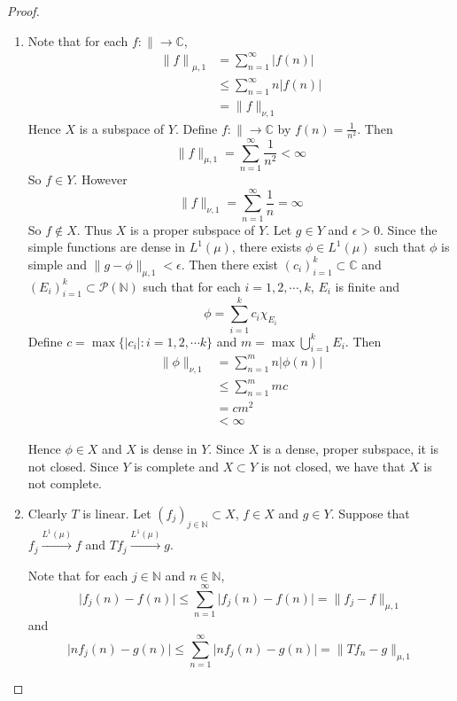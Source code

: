 \documentclass[12pt]{amsart}
\newcommand{\ep}{\epsilon}
\newcommand{\C}{\mathbb{C}}
\newcommand{\N}{\mathbb{N}}
\newcommand{\MP}{\mathcal{P}}
\newcommand{\conv}[1]{\xrightarrow{#1}}
\begin{document}
	\begin{proof}
		\begin{enumerate}
			\item Note that for each $f: \|\rightarrow \C$, 
			\begin{align*}
				{\|f \|}_{\mu, 1}
				&= \sum_{n=1}^{\infty} \vert f(n) \vert  \\
				& \leq \sum_{n=1}^{\infty} n \vert f(n) \vert  \\
				& = \|f \|_{\nu,1} 
			\end{align*} 
			Hence $X$ is a subspace of $Y$. Define $f : \|\rightarrow \C$ by $f(n) = \frac{1}{n^2}$. Then $$\|f \|_{\mu, 1} = \sum_{n=1}^{\infty} \frac{1}{n^2} < \infty$$ So  $f \in Y$. However $$\|f \|_{\nu, 1} = \sum_{n=1}^\infty \frac{1}{n} = \infty$$ So $f \not \in X$. Thus $X$ is a proper subspace of $Y$. Let $g \in Y$ and $\ep >0$. Since the simple functions are dense in $L^1(\mu)$, there exists $\phi \in L^1(\mu)$ such that $\phi$ is simple and $\|g - \phi \|_{\mu ,1} < \ep$. Then there exist $(c_i)_{i=1}^k \subset \C$ and $ (E_i)_{i=1}^k \subset \MP(\N)$ such that for each $i =1,2,\cdots, k$, $E_i$ is finite and  $$\phi = \sum_{i=1}^kc_i \chi_{E_i}$$ Define $c = \max\{\vert c_i \vert: i=1,2,\cdots k\}$ and $m = \max \bigcup_{i=1}^k E_i$. Then 
			\begin{align*}
				\|\phi \|_{\nu,1} 
				&=  \sum_{n=1}^m n \vert \phi(n) \vert \\
				& \leq \sum_{n=1}^m  mc \\
				& = c m^2 \\
				& < \infty
			\end{align*}
			
			Hence $\phi \in X$ and $X$ is dense in $Y$. Since $X$ is a dense, proper subspace, it is not closed. Since $Y$ is complete and $X \subset Y$ is not closed, we have that $X$ is not complete.
			\item Clearly $T$ is linear. Let $(f_j)_{j \in \N} \subset X$, $f \in X$ and $g \in Y$. Suppose that $f_j \conv{L^1(\mu)} f$ and $Tf_j \conv{L^1(\mu)} g$. 
			
			Note that for each $j \in \N$ and $n \in \N$, $$\vert f_j(n) - f(n) \vert \leq \sum_{n =1}^{\infty}\vert f_j(n) - f(n) \vert = \|f_j-f \|_{\mu, 1}$$ and $$\vert nf_j(n) - g(n) \vert \leq \sum_{n =1}^{\infty}\vert nf_j(n) - g(n) \vert = \|Tf_n - g\|_{\mu, 1}$$  
			

\end{enumerate}
\end{proof}
\end{document}
